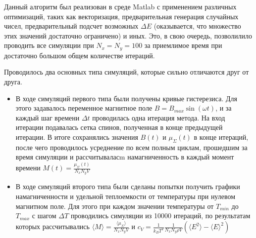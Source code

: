 \documentclass[oneside,final,14pt]{extarticle}
\begin{document}
	Данный алгоритм был реализован в среде Matlab с применением различных оптимизаций, таких как векторизация, предварительная генерация случайных чисел, предварительный подсчет возможных $\Delta E$ (оказывается, что множество этих значений достаточно ограничено) и иных. Это, в свою очередь, позволилило проводить все симуляции при $N_{x}=N_{y}=100$ за приемлимое время при достаточно большом общем количестве итераций. 

	Проводилось два основных типа симуляций, которые сильно отличаются друг от друга.
	\begin{itemize}
	\item В ходе симуляций первого типа были получены кривые гистерезиса. Для этого задавалось переменное магнитное поле $B=B_{max}\sin(\omega t)$, и за каждый шаг времени $\Delta t$ проводилась одна итерация метода. На вход итерации подавалась сетка спинов, полученная в конце предыдущей итерации. В итоге сохранялись значения $B(t)$ и $\mu_{\Sigma}(t)$ в конце итераций, после чего проводилось усреднение по всем полным циклам, прошедшим за время симуляции и рассчитываласm намагниченность в каждый момент времени $M(t)=\frac{\mu_{\Sigma}(t)}{N_{x}N_{y}V}$
	\item В ходе симуляций второго типа были сделаны попытки получить графики намагниченности и удельной теплоемкости от температуры при нулевом магнитном поле. Для этого при каждом значении температуры от $T_{min}$ до $T_{max}$ с шагом $\Delta T$ проводились симуляции из 10000 итераций, по результатам которых рассчитывались $\langle M \rangle =\frac{\langle \mu_{\Sigma} \rangle}{N_{x}N_{y}V}$ и $c_{V}=\frac{1}{k_{B}T^2}\frac{1}{N_{x}N_{y}\rho V}(\langle E^2 \rangle - {\langle E \rangle}^2)$
	\end{itemize}
\end{document}
